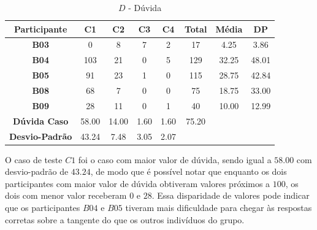 \begin{table}[htbp]
	\centering
	\caption{$D$ - Dúvida}
	\begin{tabular}{|c|c|c|c|c|ccc}
		\hline
		\rowcolor[HTML]{D0CECE} 
		\textbf{Participante} & \textbf{C1} & \textbf{C2} & \textbf{C3} & \textbf{C4} & \multicolumn{1}{c|}{\cellcolor[HTML]{D0CECE}\textbf{Total}} & \multicolumn{1}{c|}{\cellcolor[HTML]{D0CECE}\textbf{Média}} & \multicolumn{1}{c|}{\cellcolor[HTML]{D0CECE}\textbf{DP}} \\ \hline
		\textbf{B03} & 0 & 8 & 7 & 2 & \multicolumn{1}{c|}{17} & \multicolumn{1}{c|}{4.25} & \multicolumn{1}{c|}{3.86} \\ \hline
		\rowcolor[HTML]{D0CECE} 
		\textbf{B04} & 103 & 21 & 0 & 5 & \multicolumn{1}{c|}{\cellcolor[HTML]{D0CECE}129} & \multicolumn{1}{c|}{\cellcolor[HTML]{D0CECE}32.25} & \multicolumn{1}{c|}{\cellcolor[HTML]{D0CECE}48.01} \\ \hline
		\textbf{B05} & 91 & 23 & 1 & 0 & \multicolumn{1}{c|}{115} & \multicolumn{1}{c|}{28.75} & \multicolumn{1}{c|}{42.84} \\ \hline
		\rowcolor[HTML]{D0CECE} 
		\textbf{B08} & 68 & 7 & 0 & 0 & \multicolumn{1}{c|}{\cellcolor[HTML]{D0CECE}75} & \multicolumn{1}{c|}{\cellcolor[HTML]{D0CECE}18.75} & \multicolumn{1}{c|}{\cellcolor[HTML]{D0CECE}33.00} \\ \hline
		\textbf{B09} & 28 & 11 & 0 & 1 & \multicolumn{1}{c|}{40} & \multicolumn{1}{c|}{10.00} & \multicolumn{1}{c|}{12.99} \\ \hline
		\cellcolor[HTML]{D0CECE}\textbf{Dúvida Caso} & \cellcolor[HTML]{D0CECE}58.00 & \cellcolor[HTML]{D0CECE}14.00 & \cellcolor[HTML]{D0CECE}1.60 & \cellcolor[HTML]{D0CECE}1.60 & \multicolumn{1}{c|}{\cellcolor[HTML]{D0CECE}75.20} & \multicolumn{1}{l}{} & \multicolumn{1}{l}{} \\ \cline{1-6}
		\textbf{Desvio-Padrão} & 43.24 & 7.48 & 3.05 & 2.07 & \multicolumn{1}{l}{} & \multicolumn{1}{l}{} & \multicolumn{1}{l}{} \\ \cline{1-5}
	\end{tabular}
	\label{tab:F3_A5_D}
\end{table}

O caso de teste $C1$ foi o caso com maior valor de dúvida, sendo igual a $58.00$ com desvio-padrão de $43.24$, de modo que é possível notar que enquanto os dois participantes com maior valor de dúvida obtiveram valores próximos a $100$, os dois com menor valor receberam $0$ e $28$. Essa disparidade de valores pode indicar que os participantes $B04$ e $B05$ tiveram mais dificuldade para chegar às respostas corretas sobre a tangente do que os outros indivíduos do grupo. 

